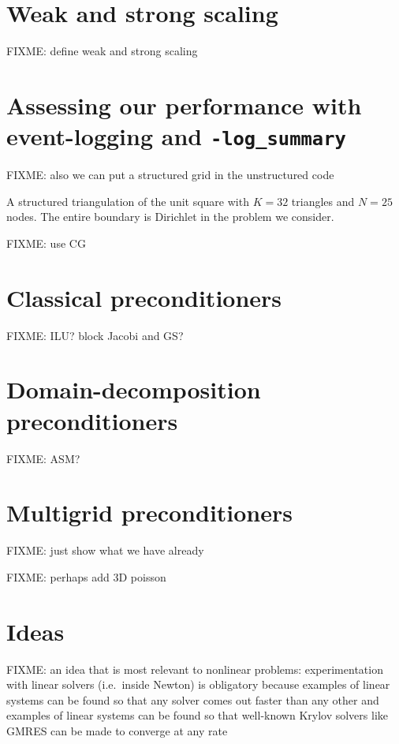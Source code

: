 
\section{Weak and strong scaling}

FIXME: define weak and strong scaling

\section{Assessing our performance with event-logging and \texttt{-log\_summary}}

\vspace{4cm}

FIXME: also we can put a structured grid in the unstructured code

\begin{marginfigure}

\caption{A structured triangulation of the unit square with $K=32$ triangles and $N=25$ nodes.  The entire boundary is Dirichlet in the problem we consider.}
\label{fig:structuredfem}
\end{marginfigure}

FIXME: use CG

\section{Classical preconditioners}

FIXME:  ILU?  block Jacobi and GS?

\section{Domain-decomposition preconditioners}

FIXME: ASM?

\section{Multigrid preconditioners}

FIXME: just show what we have already

FIXME: perhaps add 3D poisson

\section{Ideas}

FIXME: an idea that is most relevant to nonlinear problems: experimentation with linear solvers (i.e.~inside Newton) is obligatory because examples of linear systems can be found so that any solver comes out faster than any other \citep{Nachtigaletal1992} and examples of linear systems can be found so that well-known Krylov solvers like GMRES can be made to converge at any rate \citep{Greenbaumetal1996}

